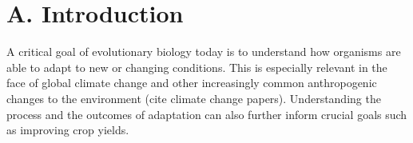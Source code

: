 
\begin{center}
\end{center}






\section*{A. Introduction}

A critical goal of evolutionary biology today is to understand how organisms are able to adapt to new or changing conditions. This is especially relevant in the face of global climate change and other increasingly common anthropogenic changes to the environment (cite climate change papers). Understanding the process and the outcomes of adaptation can also further inform crucial goals such as improving crop yields.

